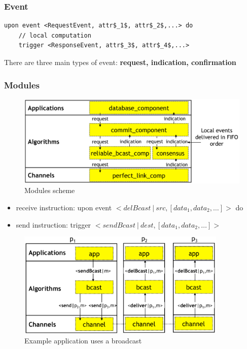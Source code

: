 \subsubsection{Event}
\begin{lstlisting}[mathescape]
upon event <RequestEvent, attr$_1$, attr$_2$,...> do
    // local computation
    trigger <ResponseEvent, attr$_3$, attr$_4$,...>
\end{lstlisting}

There are three main types of event: \textbf{request, indication,
confirmation}

\subsubsection{Modules}

\begin{figure}[!ht]
    \centering
    \includegraphics[width=0.6\linewidth]{img/module.png}
    \caption{Modules scheme}
\end{figure}
\FloatBarrier{}

\begin{itemize}
    \item receive instruction:  upon event $<delBcast\ |\ src, [data_1,
        data_2,\ldots] >$ do
    \item send instruction:
        trigger $<sendBcast\ |\ dest, [data_1, data_2,\ldots]>$
\end{itemize}

\begin{figure}[!ht]
    \centering
    \includegraphics[width=10cm]{img/ex_broadcast.png}
    \caption{Example application uses a broadcast}
\end{figure}
\FloatBarrier{}

